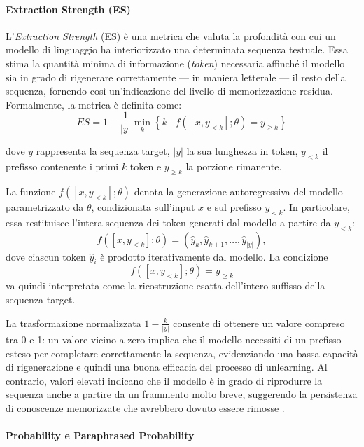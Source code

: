 \paragraph{Extraction Strength (ES)}

L'\textit{Extraction Strength} (ES) è una metrica che valuta la profondità con cui un modello di linguaggio ha interiorizzato una determinata sequenza testuale.  
Essa stima la quantità minima di informazione (\textit{token}) necessaria affinché il modello sia in grado di rigenerare correttamente --- in maniera letterale --- il resto della sequenza, fornendo così un'indicazione del livello di memorizzazione residua.  
Formalmente, la metrica è definita come:
\[
ES = 1 - \frac{1}{|y|} \min_{k} \left\{ k \mid f([x, y_{<k}]; \theta) = y_{\geq k} \right\}
\]

dove \( y \) rappresenta la sequenza target, \( |y| \) la sua lunghezza in token,  
\( y_{<k} \) il prefisso contenente i primi \( k \) token e \( y_{\geq k} \) la porzione rimanente.  

La funzione \( f([x, y_{<k}]; \theta) \) denota la generazione autoregressiva del modello parametrizzato da \( \theta \), condizionata sull'input \( x \) e sul prefisso \( y_{<k} \).  
In particolare, essa restituisce l'intera sequenza dei token generati dal modello a partire da \( y_{<k} \):
\[
f([x, y_{<k}]; \theta) = (\hat{y}_k, \hat{y}_{k+1}, \dots, \hat{y}_{|y|}),
\]
dove ciascun token \(\hat{y}_i\) è prodotto iterativamente dal modello.  
La condizione
\[
f([x, y_{<k}]; \theta) = y_{\geq k}
\]
va quindi interpretata come la ricostruzione esatta dell’intero suffisso della sequenza target.

La trasformazione normalizzata \( 1 - \frac{k}{|y|} \) consente di ottenere un valore compreso tra 0 e 1:  
un valore vicino a zero implica che il modello necessiti di un prefisso esteso per completare correttamente la sequenza, evidenziando una bassa capacità di rigenerazione e quindi una buona efficacia del processo di unlearning.  
Al contrario, valori elevati indicano che il modello è in grado di riprodurre la sequenza anche a partire da un frammento molto breve, suggerendo la persistenza di conoscenze memorizzate che avrebbero dovuto essere rimosse \cite{wang2025effectiveevaluationscomparisonsllm}.


\paragraph{Probability e Paraphrased Probability}

